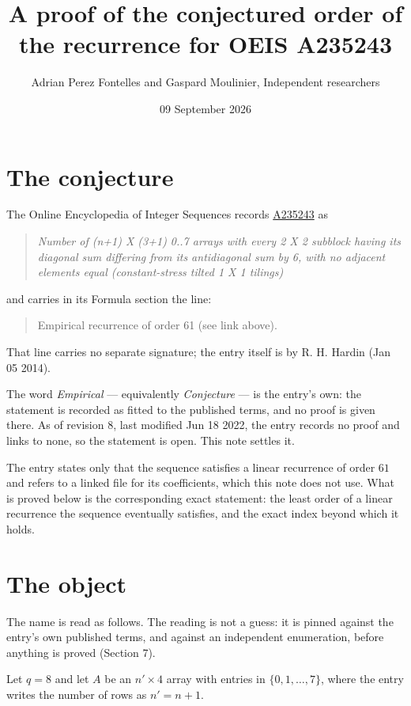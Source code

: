 \documentclass[11pt]{article}
\title{A proof of the conjectured order of the recurrence for OEIS A235243}
\author{Adrian Perez Fontelles and Gaspard Moulinier, Independent researchers}
\date{09 September 2026}
\theoremstyle{definition}
\begin{document}
\maketitle
\section{The conjecture}

The Online Encyclopedia of Integer Sequences records \href{https://oeis.org/A235243}{A235243} as

\begin{quote}\itshape Number of (n+1) X (3+1) 0..7 arrays with every 2 X 2 subblock having its diagonal sum differing from its antidiagonal sum by 6, with no adjacent elements equal (constant-stress tilted 1 X 1 tilings)\end{quote}

and carries in its Formula section the line:

\begin{quote}\ttfamily Empirical recurrence of order 61 (see link above).\end{quote}

That line carries no separate signature; the entry itself is by R. H. Hardin (Jan 05 2014).

The word {\itshape Empirical} --- equivalently {\itshape Conjecture} --- is the entry's own: the statement is recorded as fitted to the published terms, and no proof is given there. As of revision 8, last modified Jun 18 2022, the entry records no proof and links to none, so the statement is open. This note settles it.

The entry states only that the sequence satisfies a linear recurrence of order $61$ and refers to a linked file for its coefficients, which this note does not use. What is proved below is the corresponding exact statement: the least order of a linear recurrence the sequence eventually satisfies, and the exact index beyond which it holds.

\section{The object}

The name is read as follows. The reading is not a guess: it is pinned against the entry's own published terms, and against an independent enumeration, before anything is proved (Section 7).

Let $q = 8$ and let $A$ be an $n' \times 4$ array with entries in $\{0,1,\dots,7\}$, where the entry writes the number of rows as $n' = n + 1$.
\end{document}
